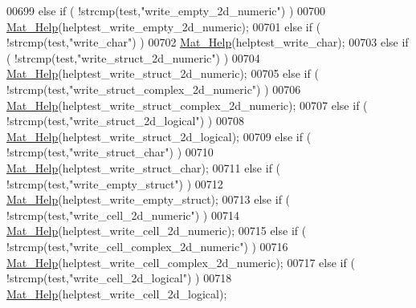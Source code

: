 \begin{DoxyCode}
{{00699     \textcolor{keywordflow}{else} \textcolor{keywordflow}{if} ( !strcmp(test,\textcolor{stringliteral}{"write\_empty\_2d\_numeric"}) )
00700         \hyperlink{group__mat__util_gaa4039c185e807ed2e9682b66fe2ea331}{Mat\_Help}(helptest\_write\_empty\_2d\_numeric);
00701     \textcolor{keywordflow}{else} \textcolor{keywordflow}{if} ( !strcmp(test,\textcolor{stringliteral}{"write\_char"}) )
00702         \hyperlink{group__mat__util_gaa4039c185e807ed2e9682b66fe2ea331}{Mat\_Help}(helptest\_write\_char);
00703     \textcolor{keywordflow}{else} \textcolor{keywordflow}{if} ( !strcmp(test,\textcolor{stringliteral}{"write\_struct\_2d\_numeric"}) )
00704         \hyperlink{group__mat__util_gaa4039c185e807ed2e9682b66fe2ea331}{Mat\_Help}(helptest\_write\_struct\_2d\_numeric);
00705     \textcolor{keywordflow}{else} \textcolor{keywordflow}{if} ( !strcmp(test,\textcolor{stringliteral}{"write\_struct\_complex\_2d\_numeric"}) )
00706         \hyperlink{group__mat__util_gaa4039c185e807ed2e9682b66fe2ea331}{Mat\_Help}(helptest\_write\_struct\_complex\_2d\_numeric);
00707     \textcolor{keywordflow}{else} \textcolor{keywordflow}{if} ( !strcmp(test,\textcolor{stringliteral}{"write\_struct\_2d\_logical"}) )
00708         \hyperlink{group__mat__util_gaa4039c185e807ed2e9682b66fe2ea331}{Mat\_Help}(helptest\_write\_struct\_2d\_logical);
00709     \textcolor{keywordflow}{else} \textcolor{keywordflow}{if} ( !strcmp(test,\textcolor{stringliteral}{"write\_struct\_char"}) )
00710         \hyperlink{group__mat__util_gaa4039c185e807ed2e9682b66fe2ea331}{Mat\_Help}(helptest\_write\_struct\_char);
00711     \textcolor{keywordflow}{else} \textcolor{keywordflow}{if} ( !strcmp(test,\textcolor{stringliteral}{"write\_empty\_struct"}) )
00712         \hyperlink{group__mat__util_gaa4039c185e807ed2e9682b66fe2ea331}{Mat\_Help}(helptest\_write\_empty\_struct);
00713     \textcolor{keywordflow}{else} \textcolor{keywordflow}{if} ( !strcmp(test,\textcolor{stringliteral}{"write\_cell\_2d\_numeric"}) )
00714         \hyperlink{group__mat__util_gaa4039c185e807ed2e9682b66fe2ea331}{Mat\_Help}(helptest\_write\_cell\_2d\_numeric);
00715     \textcolor{keywordflow}{else} \textcolor{keywordflow}{if} ( !strcmp(test,\textcolor{stringliteral}{"write\_cell\_complex\_2d\_numeric"}) )
00716         \hyperlink{group__mat__util_gaa4039c185e807ed2e9682b66fe2ea331}{Mat\_Help}(helptest\_write\_cell\_complex\_2d\_numeric);
00717     \textcolor{keywordflow}{else} \textcolor{keywordflow}{if} ( !strcmp(test,\textcolor{stringliteral}{"write\_cell\_2d\_logical"}) )
00718         \hyperlink{group__mat__util_gaa4039c185e807ed2e9682b66fe2ea331}{Mat\_Help}(helptest\_write\_cell\_2d\_logical);
}}
\end{DoxyCode}
